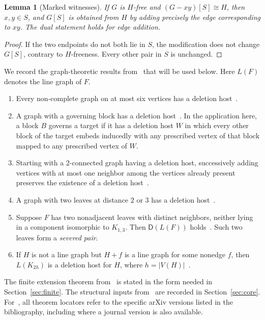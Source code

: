 \documentclass[11pt,reqno]{amsart}
\newtheorem{lemma}[theorem]{Lemma}
\theoremstyle{definition}
\theoremstyle{remark}
\newcommand{\Dsat}{\mathsf{D}}
\begin{document}
\begin{lemma}[Marked witnesses]\label{lem:marked}
If $G$ is $H$-free and $(G-xy)[S]\cong H$, then $x,y\in S$, and $G[S]$ is obtained from $H$ by adding precisely the edge corresponding to $xy$. The dual statement holds for edge addition.
\end{lemma}
\begin{proof}
If the two endpoints do not both lie in $S$, the modification does not change $G[S]$, contrary to $H$-freeness. Every other pair in $S$ is unchanged.
\end{proof}

We record the graph-theoretic results from~\cite{FHHS} that will be used below. Here $L(F)$ denotes the line graph of $F$.
\begin{enumerate}
\item Every non-complete graph on at most six vertices has a deletion host~\cite[Theorem~1.9]{FHHS}.
\item A graph with a governing block has a deletion host~\cite[Theorem~4.1]{FHHS}. In the application here, a block $B$ governs a target if it has a deletion host $W$ in which every other block of the target embeds inducedly with any prescribed vertex of that block mapped to any prescribed vertex of $W$.
\item Starting with a $2$-connected graph having a deletion host, successively adding vertices with at most one neighbor among the vertices already present preserves the existence of a deletion host~\cite[Corollary~4.2]{FHHS}.
\item A graph with two leaves at distance $2$ or $3$ has a deletion host~\cite[Theorem~5.1]{FHHS}.
\item Suppose $F$ has two nonadjacent leaves with distinct neighbors, neither lying in a component isomorphic to $K_{1,3}$. Then $\Dsat(L(F))$ holds~\cite[Theorem~5.2]{FHHS}. Such two leaves form a \emph{severed pair}.
\item If $H$ is not a line graph but $H+f$ is a line graph for some nonedge $f$, then $L(K_{2h})$ is a deletion host for $H$, where $h=|V(H)|$~\cite[Lemma~A.4(1)]{FHHS}.
\end{enumerate}
The finite extension theorem from~\cite{ABO} is stated in the form needed in Section~\ref{sec:finite}. The structural inputs from~\cite{BGJMS} are recorded in Section~\ref{sec:core}. For~\cite{ABO,BGJMS,FHHS}, all theorem locators refer to the specific arXiv versions listed in the bibliography, including where a journal version is also available.
\end{document}
